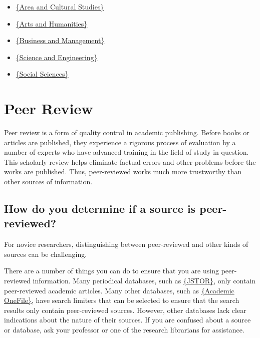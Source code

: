{\begin{itemize}
\item\href{http://www.bu.edu/library/research/guides/research-guides/area-and-cu
ltural-studies/}{\{Area and Cultural Studies\}}
    
\item\href{http://www.bu.edu/library/research/guides/research-guides/arts-and-hu
manities/}{\{Arts and Humanities\}}

\item\href{http://www.bu.edu/library/research/guides/research-guides/management-
business/}{\{Business and Management\}}

\item\href{http://www.bu.edu/library/research/guides/research-guides/science-and
-engineering/}{\{Science and Engineering\}}

\item\href{http://www.bu.edu/library/research/guides/research-guides/social-scie
nce/}{\{Social Sciences\}}
\end{itemize}

\section{Peer Review}

Peer review is a form of quality control in academic publishing. Before books 
or articles are published, they experience a rigorous process of evaluation by 
a number of experts who have advanced training in the field of study in 
question. This scholarly review helps eliminate factual errors and other 
problems before the works are published. Thus, peer-reviewed works much more 
trustworthy than other sources of information. 

\subsection{How do you determine if a source is peer-reviewed?}

For novice researchers, distinguishing between peer-reviewed and other kinds of 
sources can be challenging. 

There are a number of things you can do to ensure that you are using 
peer-reviewed information. Many periodical databases, such as 
\href{http://www.jstor.org.ezproxy.bu.edu/jstor/}{\{JSTOR\}}, only contain 
peer-reviewed academic articles. Many other databases, such as 
\href{http://infotrac.galegroup.com.ezproxy.bu.edu/itweb/mlin_b_bumml?db=AONE}{\{Academic OneFile\}}, have search limiters that can be selected to ensure 
that the search results only contain peer-reviewed sources. However, other 
databases lack clear indications about the nature of their sources. If you are 
confused about a source or database, ask your professor or one of the research 
librarians for assistance.

}
